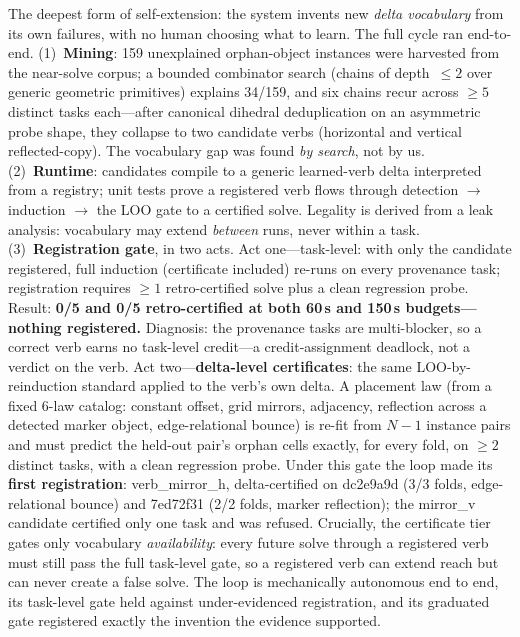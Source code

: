\documentclass[11pt]{article}
\begin{document}
The deepest form of self-extension: the system invents new \emph{delta
vocabulary} from its own failures, with no human choosing what to learn.
The full cycle ran end-to-end.  (1)~\textbf{Mining}: 159 unexplained
orphan-object instances were harvested from the near-solve corpus; a
bounded combinator search (chains of depth~$\le 2$ over generic geometric
primitives) explains 34/159, and six chains recur across $\ge 5$ distinct
tasks each---after canonical dihedral deduplication on an asymmetric probe
shape, they collapse to two candidate verbs (horizontal and vertical
reflected-copy).  The vocabulary gap was found \emph{by search}, not by us.
(2)~\textbf{Runtime}: candidates compile to a generic learned-verb delta
interpreted from a registry; unit tests prove a registered verb flows
through detection $\to$ induction $\to$ the LOO gate to a certified solve.
Legality is derived from a leak analysis: vocabulary may extend
\emph{between} runs, never within a task.
(3)~\textbf{Registration gate}, in two acts.  Act one---task-level: with
only the candidate registered, full induction (certificate included)
re-runs on every provenance task; registration requires $\ge 1$
retro-certified solve plus a clean regression probe.  Result: \textbf{0/5
and 0/5 retro-certified at both 60\,s and 150\,s budgets---nothing
registered.}  Diagnosis: the provenance tasks are multi-blocker, so a
correct verb earns no task-level credit---a credit-assignment deadlock, not
a verdict on the verb.  Act two---\textbf{delta-level certificates}: the
same LOO-by-reinduction standard applied to the verb's own delta.  A
placement law (from a fixed 6-law catalog: constant offset, grid mirrors,
adjacency, reflection across a detected marker object, edge-relational
bounce) is re-fit from $N{-}1$ instance pairs and must predict the
held-out pair's orphan cells exactly, for every fold, on $\ge 2$ distinct
tasks, with a clean regression probe.  Under this gate the loop made its
\textbf{first registration}: verb\_mirror\_h, delta-certified on dc2e9a9d
(3/3 folds, edge-relational bounce) and 7ed72f31 (2/2 folds, marker
reflection); the mirror\_v candidate certified only one task and was
refused.  Crucially, the certificate tier gates only vocabulary
\emph{availability}: every future solve through a registered verb must
still pass the full task-level gate, so a registered verb can extend reach
but can never create a false solve.  The loop is mechanically autonomous
end to end, its task-level gate held against under-evidenced registration,
and its graduated gate registered exactly the invention the evidence
supported.
\end{document}
